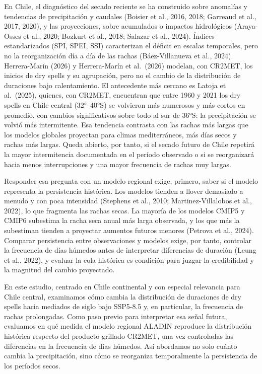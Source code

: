 En Chile, el diagnóstico del secado reciente se ha construido sobre anomalías y tendencias de precipitación y caudales (Boisier et al., 2016, 2018; Garreaud et al., 2017, 2020), y las proyecciones, sobre acumulados o impactos hidrológicos (Araya-Osses et al., 2020; Bozkurt et al., 2018; Salazar et al., 2024). Índices estandarizados (SPI, SPEI, SSI) caracterizan el déficit en escalas temporales, pero no la reorganización día a día de las rachas (Báez-Villanueva et al., 2024). Herrera-Marín (2026) y Herrera-Marín et al.~(2026) modelan, con CR2MET, los inicios de dry spells y su agrupación, pero no el cambio de la distribución de duraciones bajo calentamiento. El antecedente más cercano es Latoja et al.~(2025), quienes, con CR2MET, encuentran que entre 1960 y 2021 los dry spells en Chile central (32°--40°S) se volvieron más numerosos y más cortos en promedio, con cambios significativos sobre todo al sur de 36°S: la precipitación se volvió más intermitente. Esa tendencia contrasta con las rachas más largas que los modelos globales proyectan para climas mediterráneos, más días secos y rachas más largas. Queda abierto, por tanto, si el secado futuro de Chile repetirá la mayor intermitencia documentada en el período observado o si se reorganizará hacia menos interrupciones y una mayor frecuencia de rachas muy largas.

Responder esa pregunta con un modelo regional exige, primero, saber si el modelo representa la persistencia histórica. Los modelos tienden a llover demasiado a menudo y con poca intensidad (Stephens et al., 2010; Martinez-Villalobos et al., 2022), lo que fragmenta las rachas secas. La mayoría de los modelos CMIP5 y CMIP6 subestima la racha seca anual más larga observada, y los que más la subestiman tienden a proyectar aumentos futuros menores (Petrova et al., 2024). Comparar persistencia entre observaciones y modelos exige, por tanto, controlar la frecuencia de días húmedos antes de interpretar diferencias de duración (Leung et al., 2022), y evaluar la cola histórica es condición para juzgar la credibilidad y la magnitud del cambio proyectado.

En este estudio, centrado en Chile continental y con especial relevancia para Chile central, examinamos cómo cambia la distribución de duraciones de dry spells hacia mediados de siglo bajo SSP5-8.5 y, en particular, la frecuencia de rachas prolongadas. Como paso previo para interpretar esa señal futura, evaluamos en qué medida el modelo regional ALADIN reproduce la distribución histórica respecto del producto grillado CR2MET, una vez controladas las diferencias en la frecuencia de días húmedos. Así abordamos no solo cuánto cambia la precipitación, sino cómo se reorganiza temporalmente la persistencia de los períodos secos.

